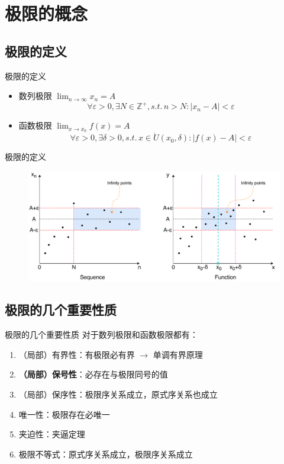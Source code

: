 \documentclass[UTF8]{ctexbeamer}
\begin{document}
\section{极限的概念}
\begin{frame}
\sectionpage
\end{frame}

\subsection{极限的定义}
\begin{frame}{极限的定义}
\begin{itemize}
	\item 数列极限 $\displaystyle\lim_{n\to\infty}x_n=A$
	\[\forall\varepsilon>0,\exists N\in\mathbb{Z}^+,s.t.\,n>N:|x_n-A|<\varepsilon\]
	\item 函数极限 $\displaystyle\lim_{x\to x_0}f(x)=A$
	\[\forall\varepsilon>0,\exists\delta>0,s.t.\,x\in\mathring{U}(x_0,\delta):|f(x)-A|<\varepsilon\]
\end{itemize}
\end{frame}

\begin{frame}{极限的定义}
\begin{figure}
\centering
\includegraphics[width=\linewidth]{fig/Limit_def.pdf}
\end{figure}
\end{frame}

\subsection{极限的几个重要性质}
\begin{frame}{极限的几个重要性质}
对于数列极限和函数极限都有：
\begin{enumerate}
	\item<1-> （局部）有界性：有极限必有界 $\to$ 单调有界原理
	\item<2-> \textbf{（局部）保号性}：必存在与极限同号的值
	\item<3-> （局部）保序性：极限序关系成立，原式序关系也成立
	\item<4-> 唯一性：极限存在必唯一
	\item<5-> 夹迫性：夹逼定理
	\item<6-> 极限不等式：原式序关系成立，极限序关系成立
\end{enumerate}
\end{frame}
\end{document}
